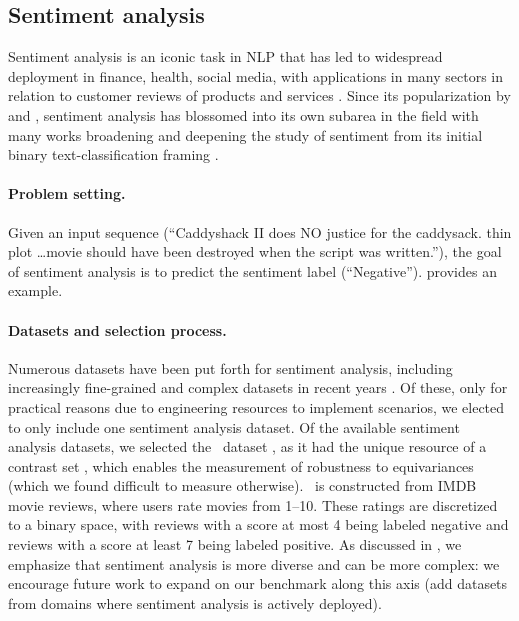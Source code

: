 \hypertarget{sentimentanalysis}{\subsection{Sentiment analysis}}
\label{sec:sentimentanalysis}

Sentiment analysis is an iconic task in NLP \citep[see][\S4]{jurafsky2000speech} that has led to widespread deployment in finance, health, social media, with applications in many sectors in relation to customer reviews of products and services \citep{pang2008opinion}.
Since its popularization by \citet{turney2002thumbs} and \citet{pang2002thumbs}, sentiment analysis has blossomed into its own subarea in the field with many works broadening and deepening the study of sentiment from its initial binary text-classification framing \citep{wiebe2005annotating, mcauley2012learning, socher2013recursive, nakov2016semeval, potts2021dynasent}.


\paragraph{Problem setting.}
Given an input sequence (\eg ``Caddyshack II does NO justice for the caddysack. thin plot \dots movie should have been destroyed when the script was written.''), the goal of sentiment analysis is to predict the sentiment label (``Negative''). 
 provides an example.

\paragraph{Datasets and selection process.}
Numerous datasets have been put forth for sentiment analysis, including increasingly fine-grained and complex datasets in recent years \citep[cf.][]{potts2021dynasent}.
Of these, only for practical reasons due to engineering resources to implement scenarios, we elected to only include one sentiment analysis dataset.
Of the available sentiment analysis datasets, we selected the \imdb~dataset \citep{maas2011imdb}, as it had the unique resource of a contrast set \citep{gardner2020contrast}, which enables the measurement of robustness to equivariances (which we found difficult to measure otherwise).
\imdb~is constructed from IMDB movie reviews, where users rate movies from 1--10.
These ratings are discretized to a binary space, with reviews with a score at most 4 being labeled negative and reviews with a score at least 7 being labeled positive. 
As discussed in \citet{potts2021dynasent}, we emphasize that sentiment analysis is more diverse and can be more complex: we encourage future work to expand on our benchmark along this axis (\eg add datasets from domains where sentiment analysis is actively deployed).

